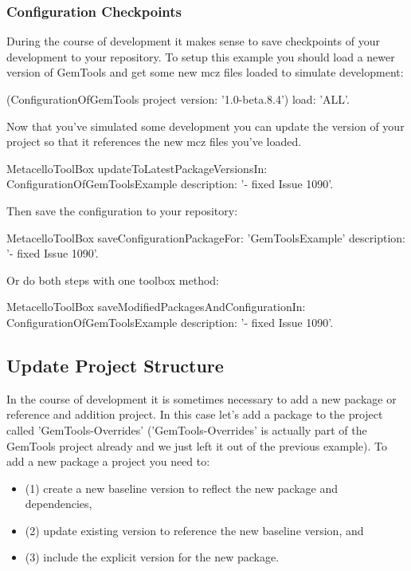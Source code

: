 \documentclass[a4paper,10pt,twoside]{book}
\begin{document}
\subsubsection{Configuration Checkpoints}

During the course of development it makes sense to save checkpoints of your development to your repository. To setup this example you should load a newer version of GemTools and get some new mcz files loaded to simulate development:

\begin{code}{}
(ConfigurationOfGemTools project version: '1.0-beta.8.4')
  load: 'ALL'.
\end{code}  

Now that you've simulated some development you can update the  version of your project so that it references the new mcz files you've loaded.

\begin{code}{}
MetacelloToolBox
  updateToLatestPackageVersionsIn: ConfigurationOfGemToolsExample
  description: '- fixed Issue 1090'.
 \end{code} 
 
Then save the configuration to your repository:

\begin{code}{}
MetacelloToolBox
  saveConfigurationPackageFor: 'GemToolsExample'
  description: '- fixed Issue 1090'.
 \end{code}
    
Or do both steps with one toolbox method:

\begin{code}{}
MetacelloToolBox
  saveModifiedPackagesAndConfigurationIn: ConfigurationOfGemToolsExample
  description: '- fixed Issue 1090'.
\end{code}
  
\subsection{Update Project Structure}

In the course of development it is sometimes necessary to add a new package or reference and addition project. In this case let's add a package to the project called 'GemTools-Overrides' ('GemTools-Overrides' is actually part of the GemTools project already and we just left it out of the previous example). To add a new package a project you need to:

\begin{itemize}
\item (1) create a new baseline version to reflect the new package and dependencies, 
\item (2) update existing  version to reference the new baseline version, and 
\item (3) include the explicit version for the new package.
\end{itemize}
\end{document}
